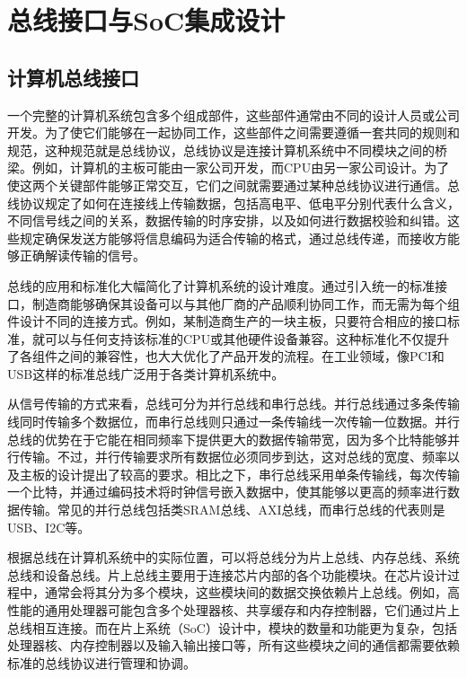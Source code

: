 
\chapter{总线接口与SoC集成设计}\label{chap:08-bus-and-soc}

\section{计算机总线接口}\label{sec:08-bus-and-soc-001}

一个完整的计算机系统包含多个组成部件，这些部件通常由不同的设计人员或公司开发。为了使它们能够在一起协同工作，这些部件之间需要遵循一套共同的规则和规范，这种规范就是总线协议，总线协议是连接计算机系统中不同模块之间的桥梁。例如，计算机的主板可能由一家公司开发，而CPU由另一家公司设计。为了使这两个关键部件能够正常交互，它们之间就需要通过某种总线协议进行通信。总线协议规定了如何在连接线上传输数据，包括高电平、低电平分别代表什么含义，不同信号线之间的关系，数据传输的时序安排，以及如何进行数据校验和纠错。这些规定确保发送方能够将信息编码为适合传输的格式，通过总线传递，而接收方能够正确解读传输的信号。

总线的应用和标准化大幅简化了计算机系统的设计难度。通过引入统一的标准接口，制造商能够确保其设备可以与其他厂商的产品顺利协同工作，而无需为每个组件设计不同的连接方式。例如，某制造商生产的一块主板，只要符合相应的接口标准，就可以与任何支持该标准的CPU或其他硬件设备兼容。这种标准化不仅提升了各组件之间的兼容性，也大大优化了产品开发的流程。在工业领域，像PCI和USB这样的标准总线广泛用于各类计算机系统中。

从信号传输的方式来看，总线可分为并行总线和串行总线。并行总线通过多条传输线同时传输多个数据位，而串行总线则只通过一条传输线一次传输一位数据。并行总线的优势在于它能在相同频率下提供更大的数据传输带宽，因为多个比特能够并行传输。不过，并行传输要求所有数据位必须同步到达，这对总线的宽度、频率以及主板的设计提出了较高的要求。相比之下，串行总线采用单条传输线，每次传输一个比特，并通过编码技术将时钟信号嵌入数据中，使其能够以更高的频率进行数据传输。常见的并行总线包括类SRAM总线、AXI总线，而串行总线的代表则是USB、I2C等。

根据总线在计算机系统中的实际位置，可以将总线分为片上总线、内存总线、系统总线和设备总线。片上总线主要用于连接芯片内部的各个功能模块。在芯片设计过程中，通常会将其分为多个模块，这些模块间的数据交换依赖片上总线。例如，高性能的通用处理器可能包含多个处理器核、共享缓存和内存控制器，它们通过片上总线相互连接。而在片上系统（SoC）设计中，模块的数量和功能更为复杂，包括处理器核、内存控制器以及输入输出接口等，所有这些模块之间的通信都需要依赖标准的总线协议进行管理和协调。

